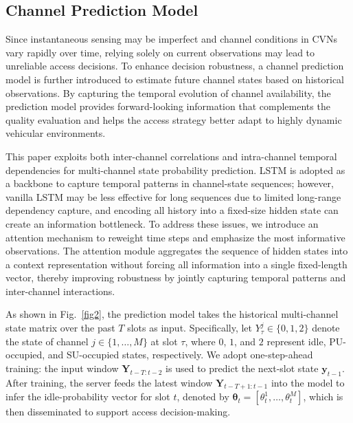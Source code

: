 \documentclass[journal]{IEEEtran}
\begin{document}
\subsection{Channel Prediction Model}
Since instantaneous sensing may be imperfect and channel conditions in CVNs vary rapidly over time, relying solely on current observations may lead to unreliable access decisions. To enhance decision robustness, a channel prediction model is further introduced to estimate future channel states based on historical observations. By capturing the temporal evolution of channel availability, the prediction model provides forward-looking information that complements the  quality evaluation and helps the access strategy better adapt to highly dynamic vehicular environments.\par
This paper exploits both inter-channel correlations and intra-channel temporal dependencies for multi-channel state probability prediction. LSTM is adopted as a backbone to capture temporal patterns in channel-state sequences; however, vanilla LSTM may be less effective for long sequences due to limited long-range dependency capture, and encoding all history into a fixed-size hidden state can create an information bottleneck. To address these issues, we introduce an attention mechanism to reweight time steps and emphasize the most informative observations. The attention module aggregates the sequence of hidden states into a context representation without forcing all information into a single fixed-length vector, thereby improving robustness by jointly capturing temporal patterns and inter-channel interactions.\par
As shown in Fig.~\ref{fig2}, the prediction model takes the historical multi-channel state matrix over the past $T$ slots as input. Specifically, let $Y_{\tau}^{j}\in\{0,1,2\}$ denote the state of channel $j\in\{1,\ldots,M\}$ at slot $\tau$, where $0$, $1$, and $2$ represent idle, PU-occupied, and SU-occupied states, respectively. We adopt one-step-ahead training: the input window $\mathbf{Y}_{t-T:t-2}$ is used to predict the next-slot state $\mathbf{y}_{t-1}$. After training, the server feeds the latest window $\mathbf{Y}_{t-T+1:t-1}$ into the model to infer the idle-probability vector for slot $t$, denoted by $\boldsymbol{\theta}_t=[\theta_t^{1},\ldots,\theta_t^{M}]$, which is then disseminated to support access decision-making.
\end{document}

